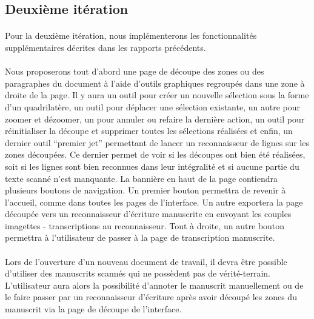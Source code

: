 
\subsection{Deuxième itération}

\paragraph{}
Pour la deuxième itération, nous implémenterons les fonctionnalités supplémentaires décrites dans les rapports précédents.

\paragraph{}
Nous proposerons tout d’abord une page de découpe des zones ou des paragraphes du document à l’aide d’outils graphiques regroupés dans une zone à droite de la page. Il y aura un outil pour créer un nouvelle sélection sous la forme d’un quadrilatère, un outil pour déplacer une sélection existante, un autre pour zoomer et dézoomer, un pour annuler ou refaire la dernière action, un outil pour réinitialiser la découpe et supprimer toutes les sélections réalisées et enfin, un dernier outil “premier jet” permettant de lancer un reconnaisseur de lignes sur les zones découpées. Ce dernier permet de voir si les découpes ont bien été réalisées, soit si les lignes sont bien reconnues dans leur intégralité et si aucune partie du texte scanné n’est manquante. 
La bannière en haut de la page contiendra plusieurs boutons de navigation. Un premier bouton permettra de revenir à l’accueil, comme dans toutes les pages de l’interface. Un autre exportera la page découpée vers un reconnaisseur d’écriture manuscrite en envoyant les couples imagettes - transcriptions au reconnaisseur. Tout à droite, un autre bouton permettra à l’utilisateur de passer à la page de transcription manuscrite.


\paragraph{}
Lors de l’ouverture d’un nouveau document de travail, il devra être possible d’utiliser des manuscrits scannés qui ne possèdent pas de vérité-terrain. L’utilisateur aura alors la possibilité d’annoter le manuscrit manuellement ou de le faire passer par un reconnaisseur d’écriture après avoir découpé les zones du manuscrit via la page de découpe de l’interface.

